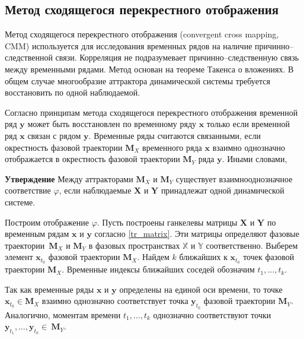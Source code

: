 \documentclass[12pt]{extarticle}
\newcommand{\bx}{\mathbf{x}}
\newcommand{\by}{\mathbf{y}}
\newcommand{\bM}{\mathbf{M}}
\newcommand{\bX}{\mathbf{X}}
\newcommand{\bY}{\mathbf{Y}}
\begin{document}
\subsection{Метод сходящегося перекрестного отображения}
Метод сходящегося перекрестного отображения (convergent cross mapping, CMM) используется для исследования временных рядов на наличие причинно--следственной связи. Корреляция не подразумевает причинно--следственную связь между временными рядами. Метод основан на теореме Такенса о вложениях. В общем случае многообразие аттрактора динамической системы требуется восстановить по одной наблюдаемой.

Согласно принципам метода сходящегося перекрестного отображения временной ряд $\by$ может быть восстановлен по временному ряду $\bx$ только если временной ряд $\bx$ связан с рядом $\by$. Временные ряды считаются связанными, если окрестность фазовой траектории $\bM_{X}$ временного ряда $\bx$ взаимно однозначно отображается в окрестность фазовой траектории $\bM_Y$ ряда $\by$. Иными словами, 

\textbf{Утверждение}
Между аттракторами $\mathbf{M}_X$ и $\mathbf{M}_Y$ существует взаимнооднозначное соответствие $\varphi$, если наблюдаемые $\mathbf{X}$ и $\mathbf{Y}$ принадлежат одной динамической системе.

Построим отображение $\varphi$. Пусть построены ганкелевы матрицы $\bX$ и $\bY$ по временным рядам $\bx$ и $\by$ согласно \eqref{tr_matrix}. Эти матрицы определяют фазовые траектории~$\bM_{X}$ и $\bM_Y$ в фазовых пространствах $\mathbb{X}$ и $\mathbb{Y}$ соответственно. Выберем элемент $\bx_{t_0}$ фазовой траектории $\bM_{X}$. Найдем $k$ ближайших к $\bx_{t_0}$ точек  фазовой траектории $\bM_{X}$. Временные индексы ближайших соседей обозначим $t_1,\dots,t_k$.

Так как временные ряды $\bx$ и $\by$ определены на единой оси времени, то точке\\$\bx_{t_0}\in\bM_X$ взаимно однозначно соответствует точка $\by_{t_0}$ фазовой траектории $\bM_Y$. Аналогично, моментам времени $t_1,\dots,t_k$ однозначно соответствуют точки $\by_{t_1},\dots,\by_{t_k}\in~\bM_Y$.
\end{document}
